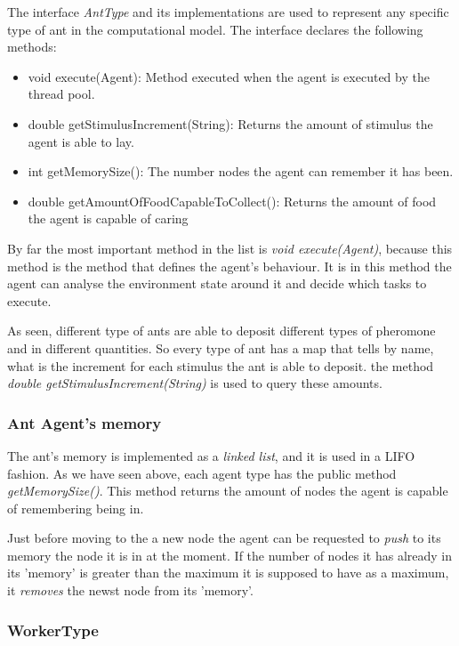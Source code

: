The interface \emph{AntType} and its implementations are used to represent any specific type of ant in the computational model. The interface declares the following methods:

\begin{itemize}

  \item void execute(Agent): Method executed when the agent is executed by the thread pool.
  \item double getStimulusIncrement(String): Returns the amount of stimulus the agent is able to lay.
  \item int getMemorySize(): The number nodes the agent can remember it has been.
  \item double getAmountOfFoodCapableToCollect(): Returns the amount of food the agent is capable of caring 

\end{itemize}


By far the most important method in the list is \emph{void execute(Agent)}, because this method is the method that defines the agent's behaviour. It is in this method the agent can analyse the environment state around it and decide which tasks to execute.

As seen, different type of ants are able to deposit different types of pheromone and in different quantities. So every type of ant has a map that tells by name, what is the increment for each stimulus the ant is able to deposit. the method \emph{double getStimulusIncrement(String)} is used to query these amounts.

\subsubsection{Ant Agent's memory}
\label{sec:ant-memory}

The ant's memory is implemented as a \emph{linked list}, and it is used in a \ac{LIFO} fashion. As we have seen above, each agent type has the public method \emph{getMemorySize()}. This method returns the amount of nodes the agent is capable of remembering being in.

Just before moving to the a new node the agent can be requested to \emph{push} to its memory the node it is in at the moment. If the number of nodes it has already in its 'memory' is greater than the maximum it is supposed to have as a maximum, it \emph{removes} the newst node from its 'memory'.

\subsubsection{WorkerType}

